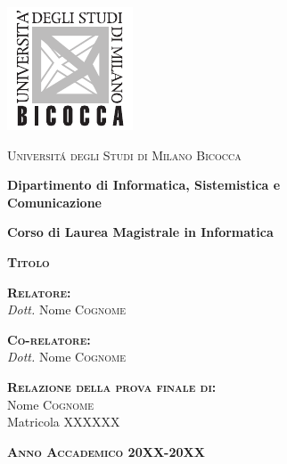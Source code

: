 \newpage
\thispagestyle{empty}
\noindent
\hspace*{-1mm}
\includegraphics[width=0.2\columnwidth]{assets/images/logo_unimib.pdf}
\hspace*{2mm}
\begin{minipage}[b][][c]{0.8\columnwidth}
{\large\textsc{Universit\'a degli Studi di Milano Bicocca}\par}
{\Large\textbf{Dipartimento di Informatica, Sistemistica e\\ Comunicazione}\par}
{\Large\textbf{Corso di Laurea Magistrale in Informatica}\par}
\end{minipage}
\vfill
\begin{center}
{\Huge\textsc{\textbf{Titolo}}\par}
\end{center}
\vfill
\large
\begin{flushleft}
\textbf{\textsc{Relatore:}}\\
\hspace*{2em}\textit{Dott.} Nome \textsc{Cognome}
\end{flushleft}
\begin{flushleft}
\textbf{\textsc{Co-relatore:}}\\
\hspace*{2em}\textit{Dott.} Nome \textsc{Cognome}\\
\end{flushleft}
\vskip 1cm
\begin{flushright}
\textbf{\textsc{Relazione della prova finale di:}}\\
\hspace*{2em}Nome \textsc{Cognome}\\
\hspace*{2em}Matricola XXXXXX
\end{flushright}
\vfill
\begin{center}
\textsc{\textbf{Anno Accademico 20XX-20XX}}
\end{center}

\newpage